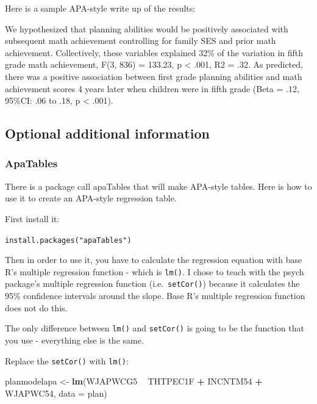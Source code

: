 \documentclass[
]{book}
\newenvironment{Shaded}{\begin{snugshade}}{\end{snugshade}}
\newcommand{\DataTypeTok}[1]{\textcolor[rgb]{0.13,0.29,0.53}{#1}}
\newcommand{\KeywordTok}[1]{\textcolor[rgb]{0.13,0.29,0.53}{\textbf{#1}}}
\newcommand{\NormalTok}[1]{#1}
\newcommand{\OperatorTok}[1]{\textcolor[rgb]{0.81,0.36,0.00}{\textbf{#1}}}
\newcommand{\StringTok}[1]{\textcolor[rgb]{0.31,0.60,0.02}{#1}}
\begin{document}
Here is a sample APA-style write up of the results:

We hypothesized that planning abilities would be positively associated with subsequent math achievement controlling for family SES and prior math achievement. Collectively, these variables explained 32\% of the variation in fifth grade math achievement, F(3, 836) = 133.23, p \textless{} .001, R2 = .32. As predicted, there was a positive association between first grade planning abilities and math achievement scores 4 years later when children were in fifth grade (Beta = .12, 95\%CI: .06 to .18, p \textless{} .001).

\hypertarget{optional-additional-information}{%
\subsection{Optional additional information}\label{optional-additional-information}}

\hypertarget{apatables}{%
\subsubsection{ApaTables}\label{apatables}}

There is a package call apaTables that will make APA-style tables. Here is how to use it to create an APA-style regression table.

First install it:

\texttt{install.packages("apaTables")}

Then in order to use it, you have to calculate the regression equation with base R's multiple regression function - which is \texttt{lm()}. I chose to teach with the psych package's multiple regression function (i.e.~\texttt{setCor()}) because it calculates the 95\% confidence intervals around the slope. Base R's multiple regression function does not do this.

The only difference between \texttt{lm()} and \texttt{setCor()} is going to be the function that you use - everything else is the same.

Replace the \texttt{setCor()} with \texttt{lm()}:

\begin{Shaded}
\begin{Highlighting}[]
\NormalTok{planmodelapa <-}\StringTok{ }\KeywordTok{lm}\NormalTok{(WJAPWCG5 }\OperatorTok{~}\StringTok{ }\NormalTok{THTPEC1F }\OperatorTok{+}\StringTok{ }\NormalTok{INCNTM54 }\OperatorTok{+}\StringTok{ }\NormalTok{WJAPWC54, }\DataTypeTok{data =}\NormalTok{ plan)}
\end{Highlighting}
\end{Shaded}
\end{document}
